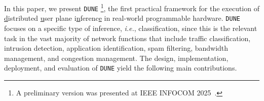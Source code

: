 \documentclass[journal]{IEEEtran}
\theoremstyle{plain} %
\newcommand{\ie}{\textit{i.e.},\xspace}
\newcommand{\bb}[1]{\textcolor{orange}{[Beyza: #1]}}
\newcommand{\name}{\texttt{\fontsize{9}{11}\selectfont DUNE}\xspace}
\begin{document}

In this paper, we present \name%
\footnote{A preliminary version was presented at IEEE INFOCOM 2025~\cite{DUNE}.}, the first practical framework for the execution of \ul{d}istributed \ul{u}ser plane i\ul{n}ferenc\ul{e} in real-world programmable hardware. 
\name focuses on a specific type of inference, \ie classification, since this is the relevant task in the vast majority of network functions that include traffic classification, intrusion detection, application identification, spam filtering, bandwidth management, and congestion management.
%
The design, implementation, deployment, and evaluation of \name yield the following main contributions.
\end{document}
